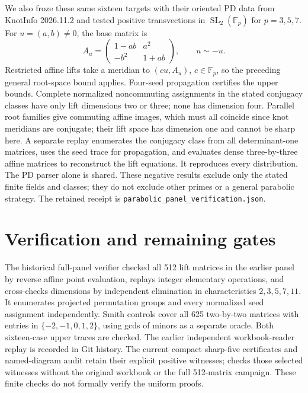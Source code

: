 \documentclass[11pt]{article}
\newcommand{\F}{\mathbb F}
\begin{document}
We also froze these same sixteen targets with their oriented PD data
from KnotInfo 2026.11.2 and tested positive transvections in
$\operatorname{SL}_2(\F_p)$ for $p=3,5,7$. For
$u=(a,b)\ne0$, the base matrix is
\[
 A_u=\begin{pmatrix}1-ab&a^2\\-b^2&1+ab\end{pmatrix},
 \qquad u\sim-u.
\]
Restricted affine lifts take a meridian to $(c u,A_u)$, $c\in\F_p$,
so the preceding general root-space bound applies. Four-seed propagation
certifies the upper bounds. Complete normalized noncommuting assignments
in the stated conjugacy classes have only lift dimensions two or three;
none has dimension four. Parallel root families give commuting affine
images, which must all coincide since knot meridians are conjugate;
their lift space has dimension one and cannot be sharp here.
A separate replay enumerates the conjugacy class
from all determinant-one matrices, uses the seed trace for propagation,
and evaluates dense three-by-three affine matrices to reconstruct the
lift equations. It reproduces every distribution. The PD parser alone
is shared. These negative results exclude only the stated finite fields
and classes; they do not exclude other primes or a general parabolic
strategy. The retained receipt is
\texttt{parabolic\_panel\_verification.json}.

\section{Verification and remaining gates}

The historical full-panel verifier checked all 512 lift matrices in the earlier
panel by reverse affine point evaluation, replays integer elementary
operations, and cross-checks dimensions by independent elimination in
characteristics $2,3,5,7,11$. It enumerates projected permutation groups
and every normalized seed assignment independently. Smith controls
cover all 625 two-by-two matrices with entries in $\{-2,-1,0,1,2\}$,
using gcds of minors as a separate oracle. Both sixteen-case upper
traces are checked. The earlier independent workbook-reader replay is
recorded in Git history. The current compact sharp-five certificates and
named-diagram audit retain their explicit positive witnesses;
 checks those selected witnesses without the
original workbook or the full 512-matrix campaign. These finite checks
do not formally verify the uniform proofs.
\end{document}
